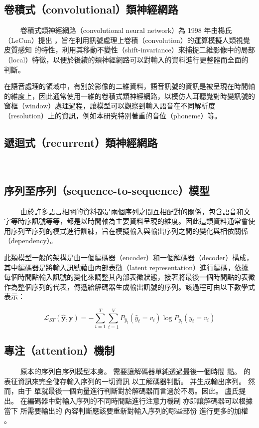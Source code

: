 \subsection{卷積式（convolutional）類神經網路}　　
卷積式類神經網路（convolutional neural network）為 1998 年由楊氏（LeCun）提出 \cite{726791}，旨在利用訊號處理上卷積（convolution）的運算模擬人類視覺皮質感知 \cite{hubel1959receptive} 的特性，利用其移動不變性（shift-invariance）來捕捉二維影像中的局部（local）特徵，以便於後續的類神經網路可以對輸入的資料進行更整體而全面的判斷。



在語音處理的領域中，有別於影像的二維資料，語音訊號的資訊是被呈現在時間軸的維度上，因此通常使用一維的卷積式類神經網路，以模仿人耳聽覺對時變訊號的窗框（window）處理過程，讓模型可以觀察到輸入語音在不同解析度（resolution）上的資訊，例如本研究特別著重的音位（phoneme）等。


\subsection{遞迴式（recurrent）類神經網路}　　

\subsection{序列至序列（sequence-to-sequence）模型}　　
由於許多語言相關的資料都是兩個序列之間互相配對的關係，包含語音和文字等時序訊號等等，都是以時間軸為主要資料呈現的維度。因此這類資料通常會使用序列至序列的模式進行訓練，旨在模擬輸入與輸出序列之間的變化與相依關係（dependency）。

此類模型一般的架構是由一個編碼器（encoder）和一個解碼器（decoder）構成，其中編碼器是將輸入訊號藉由內部表徵（latent representation）進行編碼，依據每個時間點輸入訊號的變化來調整其內部表徵狀態，接著將最後一個時間點的表徵作為整個序列的代表，傳遞給解碼器生成輸出訊號的序列。該過程可由以下數學式表示：

$$\mathcal{L} _{ST}(\hat{\bm{y}}, \bm{y}) = -\sum_{t=1}^T \sum_{i=1}^V P_{\hat{y}_t}(\hat{y}_t = v_i)\log P_{y_t}(y_t = v_i) $$

\subsection{專注（attention）機制}　　
原本的序列自序列模型本身。 需要讓解碼器單純透過最後一個時間 點。 的表征資訊來完全儲存輸入序列的一切資訊 以工解碼器判斷。 并生成輸出序列。 然而，由于 單就最後一個向量進行判斷對於解碼器而言過於不易。因此。 盧氏提出。 在編碼器中對輸入序列的不同時間點進行注意力機制 亦即讓解碼器可以根據當下 所需要輸出的 內容判斷應該要重新對輸入序列的哪些部份 進行更多的加權 。

